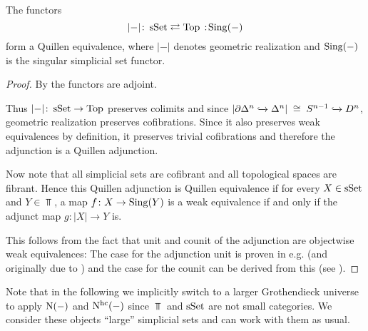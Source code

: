 \begin{thm}\label{prop:quillenEqSSetTop}
    The functors
    \begin{equation*}
        \lvert-\rvert\colon\sSet\rightleftarrows\Top\mkern+3mu:\mkern-3mu\Sing(-)
    \end{equation*}
    form a Quillen equivalence, where $\lvert-\rvert$ denotes geometric realization and $\operatorname{Sing}(-)$ is the singular simplicial set functor.
    \begin{proof}
        By \cite[Corollary 1.1.8.5]{kerodon} the functors are adjoint.

        Thus $\lvert-\rvert\colon\operatorname{sSet}\to\operatorname{Top}$ preserves colimits and since $\lvert\partial\Delta^n\xhookrightarrow{}\Delta^n\rvert\;\cong\;S^{n-1}\xhookrightarrow{} D^n$, geometric realization preserves cofibrations.
        Since it also preserves weak equivalences by definition, it preserves trivial cofibrations and therefore the adjunction is a Quillen adjunction.

        Now note that all simplicial sets are cofibrant and all topological spaces are fibrant.
        Hence this Quillen adjunction is Quillen equivalence if for every $X\in\operatorname{sSet}$ and $Y\in\Top$, a map $f\colon X\to\operatorname{Sing}(Y)$ is a weak equivalence if and only if the adjunct map $g\colon\lvert X\rvert\to Y$ is.
        
        This follows from the fact that unit and counit of the adjunction are objectwise weak equivalences:
        The case for the adjunction unit is proven in e.g. \cite[Theorem 3.5.4.1]{kerodon} (and originally due to \cite{milnor_unit_we}) and the case for the counit can be derived from this (see \cite[Corollary 3.5.4.2]{kerodon}).
    \end{proof}
\end{thm}
\begin{remark}
    Note that in the following we implicitly switch to a larger Grothendieck universe to apply $\operatorname{N}(-)$ and $\operatorname{N^{hc}}(-)$ since $\Top$ and $\operatorname{sSet}$ are not small categories.
    We consider these objects ``large'' simplicial sets and can work with them as usual.
\end{remark}
